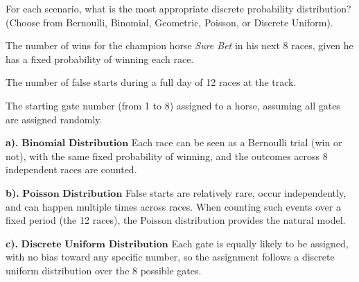 \documentclass[a4paper, 10pt]{article}
\begin{document}
\begin{problem}
For each scenario, what is the most appropriate discrete probability distribution?
(Choose from Bernoulli, Binomial, Geometric, Poisson, or Discrete Uniform).
\begin{subproblems_alpha}
	\item The number of wins for the champion horse \textit{Sure Bet} in his next 8 races, given he has a fixed probability of winning each race.
	\item The number of false starts during a full day of 12 races at the track.
	\item The starting gate number (from 1 to 8) assigned to a horse, assuming all gates are assigned randomly.
\end{subproblems_alpha}
\end{problem}

\begin{solution}
	\myspace

	\par\noindent\textbf{a).} \( \boxed{\textbf{Binomial Distribution}} \) Each race can be seen as a Bernoulli trial (win or not),
	with the same fixed probability of winning, and the outcomes across 8 independent races are counted.

	\myspace

	\par\noindent\textbf{b).} \( \boxed{\textbf{Poisson Distribution}} \) False starts are relatively rare, occur independently,
	and can happen multiple times across races. When counting such events over a fixed period (the 12 races),
	the Poisson distribution provides the natural model.

	\myspace

	\par\noindent\textbf{c).} \( \boxed{\textbf{Discrete Uniform Distribution}} \) Each gate is equally likely to be assigned,
	with no bias toward any specific number, so the assignment follows a discrete uniform distribution over the 8 possible gates.
\end{solution}

\pagebreak
\end{document}
